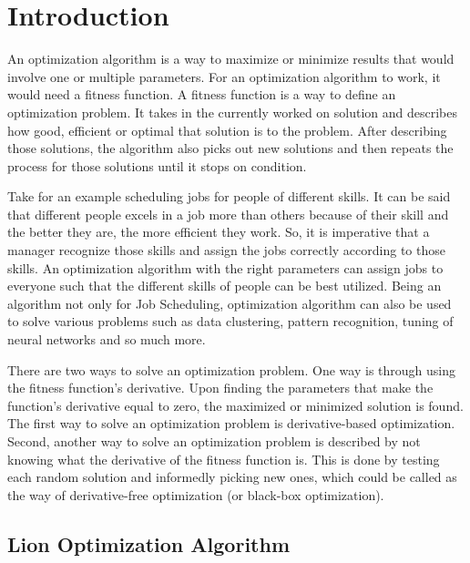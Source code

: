 \section{Introduction}
\par An optimization algorithm is a way to maximize or minimize results that would involve one or multiple parameters. For an optimization algorithm to work, it would need a fitness function. A fitness function is a way to define an optimization problem. It takes in the currently worked on solution and describes how good, efficient or optimal that solution is to the problem. After describing those solutions, the algorithm also picks out new solutions and then repeats the process for those solutions until it stops on condition.

\par Take for an example scheduling jobs for people of different skills. It can be said that different people excels in a job more than others because of their skill and the better they are, the more efficient they work. So, it is imperative that a manager recognize those skills and assign the jobs correctly according to those skills. An optimization algorithm with the right parameters can assign jobs to everyone such that the different skills of people can be best utilized. Being an algorithm not only for Job Scheduling, optimization algorithm can also be used to solve various problems such as data clustering, pattern recognition, tuning of neural networks and so much more.

\par There are two ways to solve an optimization problem. One way is through using the fitness function's derivative. Upon finding the parameters that make the function's derivative equal to zero, the maximized or minimized solution is found. The first way to solve an optimization problem is derivative-based optimization. Second, another way to solve an optimization problem is described by not knowing what the derivative of the fitness function is. This is done by testing each random solution and informedly picking new ones, which could be called as the way of derivative-free optimization (or black-box optimization).

\subsection{Lion Optimization Algorithm}

